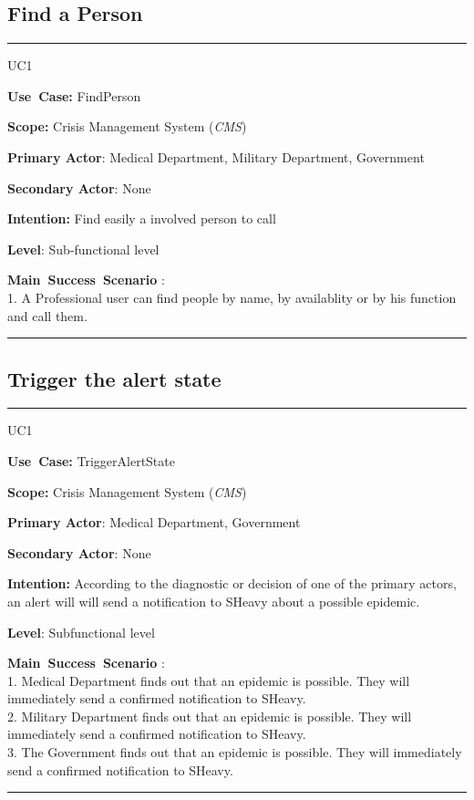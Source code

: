 \subsection{Find a Person}
\vspace{0.5cm}
\hrule
\vspace{0.5cm}
\begin{lyxlist}{UC1}
\small{
\item [\textbf{Use~Case:}] FindPerson
\item [\textbf{Scope:}] Crisis Management System (\emph{CMS})
\item [\textbf{Primary Actor}:] Medical Department, Military Department,
Government
\item [\textbf{Secondary Actor}:] None
\item [\textbf{Intention:}] Find easily a involved person to call
\item [\textbf{Level}:]Sub-functional level
\item [\textbf{Main~Success~Scenario}]:\\
1. A Professional user can find people by name, by availablity or by his
function and call them.\\
}
\end{lyxlist}
\hrule 
\vspace{0.5cm} 

\subsection{Trigger the alert state}
\vspace{0.5cm}
\hrule
\vspace{0.5cm}
\begin{lyxlist}{UC1}
\small{
\item [\textbf{Use~Case:}] TriggerAlertState
\item [\textbf{Scope:}] Crisis Management System (\emph{CMS})
\item [\textbf{Primary Actor}:] Medical Department, Government
\item [\textbf{Secondary Actor}:] None
\item [\textbf{Intention:}] According to the diagnostic or decision of one of
the primary actors, an alert will will send a notification to SHeavy about a
possible epidemic.
\item [\textbf{Level}:]Subfunctional level
\item [\textbf{Main~Success~Scenario}]:\\
1. Medical Department finds out that an epidemic is possible. They will
immediately send a confirmed notification to SHeavy.\\
2. Military Department finds out that an epidemic is possible. They will
immediately send a confirmed notification to SHeavy.\\
3. The Government finds out that an epidemic is possible. They will
immediately send a confirmed notification to SHeavy.\\
}
\end{lyxlist}
\hrule 
\vspace{0.5cm} 

